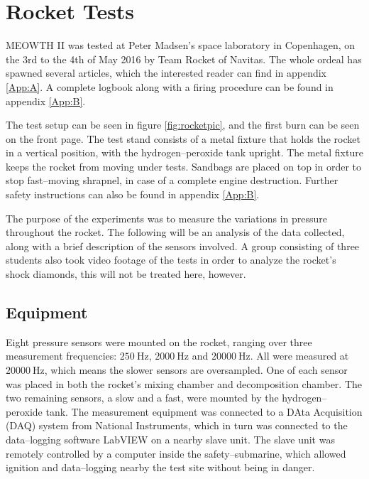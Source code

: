 \chapter{Rocket Tests}\label{cha:experimental}

	MEOWTH II was tested at Peter Madsen's space laboratory in Copenhagen, on the 3rd to the 4th of May 2016 by Team Rocket of Navitas. The whole ordeal has spawned several articles, which the interested reader can find in appendix \ref{App:A}. A  complete logbook along with a firing procedure can be found in appendix \ref{App:B}.

	The test setup can be seen in figure \ref{fig:rocketpic}, and the first burn can be seen on the front page. The test stand consists of a metal fixture that holds the rocket in a vertical position, with the hydrogen--peroxide tank upright. The metal fixture keeps the rocket from moving under tests. Sandbags are placed on top in order to stop fast--moving shrapnel, in case of a complete engine destruction. Further safety instructions can also be found in appendix \ref{App:B}.

	The purpose of the experiments was to measure the variations in pressure throughout the rocket. The following will be an analysis of the data collected, along with a brief description of the sensors involved. A group consisting of three students also took video footage of the tests in order to analyze the rocket's shock diamonds, this will not be treated here, however.

	\section{Equipment}

	Eight pressure sensors were mounted on the rocket, ranging over three measurement frequencies: $\SI{250}{\Hz}$, $\SI{2000}{\Hz}$ and $\SI{20000}{\Hz}$. All were measured at $\SI{20000}{\Hz}$, which means the slower sensors are oversampled. One of each sensor was placed in both the rocket's mixing chamber and decomposition chamber. The two remaining sensors, a slow and a fast, were mounted by the hydrogen--peroxide tank. The measurement equipment was connected to a DAta Acquisition (DAQ) system from National Instruments, which in turn was connected to the data--logging software LabVIEW on a nearby slave unit. The slave unit was remotely controlled by a computer inside the safety--submarine, which allowed ignition and data--logging nearby the test site without being in danger.

